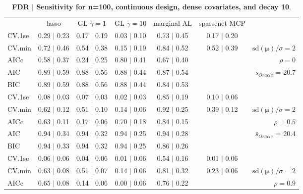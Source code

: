 \clearpage
\begin{table}\vspace{-.5cm}
\caption[l]{ {\it }
{ \bf FDR $\boldsymbol{\mid}$ Sensitivity for n=100, continuous design, dense covariates, and  decay  10}.}
\vspace{-.5cm}
\footnotesize{}
\begin{center}
\begin{tabular}{l*{5}{c}|r}
 & lasso & GL $\gamma=1$ & GL $\gamma=10$ & marginal AL & sparsenet MCP  & \\
 \cline{1-7}
CV.1se & 0.29 $\mid$ 0.23 & 0.17 $\mid$ 0.19 & 0.03 $\mid$ 0.10 & 0.73 $\mid$ 0.45 & 0.17 $\mid$ 0.20 & \\
CV.min & 0.72 $\mid$ 0.46 & 0.54 $\mid$ 0.38 & 0.15 $\mid$ 0.19 & 0.84 $\mid$ 0.52 & 0.52 $\mid$ 0.39 &  $\mathrm{sd}(\mathbf{\mu})/\sigma=2$ \\
AICc & 0.58 $\mid$ 0.37 & 0.24 $\mid$ 0.25 & 0.80 $\mid$ 0.41 & 0.67 $\mid$ 0.40 & & $\rho=0$ \\
AIC & 0.89 $\mid$ 0.59 & 0.88 $\mid$ 0.56 & 0.88 $\mid$ 0.44 & 0.87 $\mid$ 0.54 & &  \multirow{2}{*}{$\bar{s}_{Oracle}$ = 20.7} \\
BIC & 0.89 $\mid$ 0.59 & 0.88 $\mid$ 0.56 & 0.88 $\mid$ 0.44 & 0.84 $\mid$ 0.53 & &  \\
 \hline 
CV.1se & 0.08 $\mid$ 0.03 & 0.07 $\mid$ 0.03 & 0.02 $\mid$ 0.03 & 0.85 $\mid$ 0.19 & 0.10 $\mid$ 0.06 & \\
CV.min & 0.62 $\mid$ 0.12 & 0.51 $\mid$ 0.10 & 0.14 $\mid$ 0.06 & 0.92 $\mid$ 0.25 & 0.39 $\mid$ 0.12 &  $\mathrm{sd}(\mathbf{\mu})/\sigma=2$ \\
AICc & 0.63 $\mid$ 0.11 & 0.17 $\mid$ 0.06 & 0.70 $\mid$ 0.18 & 0.84 $\mid$ 0.15 & & $\rho=0.5$ \\
AIC & 0.94 $\mid$ 0.34 & 0.94 $\mid$ 0.32 & 0.94 $\mid$ 0.25 & 0.94 $\mid$ 0.28 & &  \multirow{2}{*}{$\bar{s}_{Oracle}$ = 20.4} \\
BIC & 0.94 $\mid$ 0.33 & 0.94 $\mid$ 0.32 & 0.94 $\mid$ 0.25 & 0.86 $\mid$ 0.26 & &  \\
 \hline 
CV.1se & 0.06 $\mid$ 0.06 & 0.04 $\mid$ 0.06 & 0.01 $\mid$ 0.06 & 0.54 $\mid$ 0.16 & 0.01 $\mid$ 0.06 & \\
CV.min & 0.63 $\mid$ 0.08 & 0.51 $\mid$ 0.07 & 0.14 $\mid$ 0.06 & 0.81 $\mid$ 0.32 & 0.23 $\mid$ 0.06 &  $\mathrm{sd}(\mathbf{\mu})/\sigma=2$ \\
AICc & 0.65 $\mid$ 0.08 & 0.14 $\mid$ 0.06 & 0.00 $\mid$ 0.06 & 0.76 $\mid$ 0.22 & & $\rho=0.9$ \\

\end{tabular}
\end{center}
\end{table}
